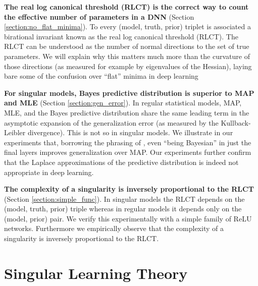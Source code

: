 \documentclass{article} %
\begin{document}
\textbf{The real log canonical threshold (RLCT) is the correct way to count the effective number of parameters in a DNN} (Section \ref{section:no_flat_minima}). 
    To every (model, truth, prior) triplet is associated a birational invariant known as the real log canonical threshold (RLCT). The RLCT can be understood as the number of normal directions to the set of true parameters. We will explain why this matters much more than the curvature of those directions (as measured for example by eigenvalues of the Hessian), laying bare some of the confusion over ``flat'' minima in deep learning 

\textbf{For singular models, Bayes predictive distribution is superior to MAP and MLE} (Section \ref{section:gen_error}). In regular statistical models, MAP, MLE, and the Bayes predictive distribution share the same leading term in the asymptotic expansion of the generalization error (as measured by the Kullback-Leibler divergence). This is not so in singular models. We illustrate in our experiments that, borrowing the phrasing of \citet{kristiadi_being_2020}, even ``being Bayesian''  in just the final layers improves generalization over MAP. Our experiments further confirm that the Laplace approximations of the predictive distribution is indeed not appropriate in deep learning.

\textbf{The complexity of a singularity is inversely proportional to the RLCT} (Section \ref{section:simple_func}). In singular models the RLCT depends on the (model, truth, prior) triple whereas in regular models it depends only on the (model, prior) pair.
     We verify this experimentally with a simple family of ReLU networks. Furthermore we empirically observe that the complexity of a singularity is inversely proportional to the RLCT.


\section{Singular Learning Theory}
\end{document}
